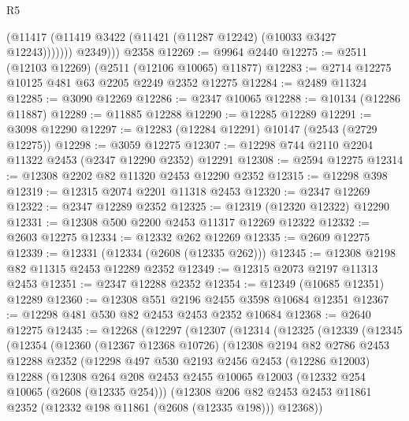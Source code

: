 \begin{lexlean}{R5}
\begin{coremodule}
              (@11417 (@11419 @3422 (@11421 (@11287 @12242) (@10033 @3427 @12243)))))))
          @2349)))
    @2358
@12269 := @9964 @2440
@12275 := @2511 (@12103 @12269) (@2511 (@12106 @10065) @11877)
@12283 := @2714 @12275 @10125 @481 @63 @2205 @2249 @2352 @12275
@12284 := @2489 @11324
@12285 := @3090 @12269
@12286 := @2347 @10065
@12288 := @10134 (@12286 @11887)
@12289 := @11885 @12288
@12290 := @12285 @12289
@12291 := @3098 @12290
@12297 := @12283 (@12284 @12291) @10147 (@2543 (@2729 @12275))
@12298 := @3059 @12275
@12307 := @12298 @744 @2110 @2204 @11322 @2453 (@2347 @12290 @2352) @12291
@12308 := @2594 @12275
@12314 := @12308 @2202 @82 @11320 @2453 @12290 @2352
@12315 := @12298 @398
@12319 := @12315 @2074 @2201 @11318 @2453
@12320 := @2347 @12269
@12322 := @2347 @12289 @2352
@12325 := @12319 (@12320 @12322) @12290
@12331 := @12308 @500 @2200 @2453 @11317 @12269 @12322
@12332 := @2603 @12275
@12334 := @12332 @262 @12269
@12335 := @2609 @12275
@12339 := @12331 (@12334 (@2608 (@12335 @262)))
@12345 := @12308 @2198 @82 @11315 @2453 @12289 @2352
@12349 := @12315 @2073 @2197 @11313 @2453
@12351 := @2347 @12288 @2352
@12354 := @12349 (@10685 @12351) @12289
@12360 := @12308 @551 @2196 @2455 @3598 @10684 @12351
@12367 := @12298 @481 @530 @82 @2453 @2453 @2352 @10684
@12368 := @2640 @12275
@12435 := @12268
    (@12297
      (@12307
        (@12314
          (@12325
            (@12339
              (@12345
                (@12354
                  (@12360
                    (@12367 @12368 @10726)
                    (@12308
                      @2194
                      @82
                      @2786
                      @2453
                      @12288
                      @2352
                      (@12298
                        @497
                        @530
                        @2193
                        @2456
                        @2453
                        (@12286 @12003)
                        @12288
                        (@12308
                          @264
                          @208
                          @2453
                          @2455
                          @10065
                          @12003
                          (@12332 @254 @10065 (@2608 (@12335 @254)))
                          (@12308
                            @206
                            @82
                            @2453
                            @2453
                            @11861
                            @2352
                            (@12332 @198 @11861 (@2608 (@12335 @198)))
                            @12368))

\end{coremodule}
\end{lexlean}
